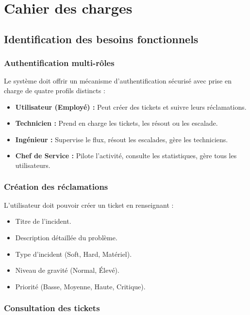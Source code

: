 \documentclass[12pt,a4paper,oneside]{report}
\begin{document}
\section{Cahier des charges}

\subsection{Identification des besoins fonctionnels}

\subsubsection{Authentification multi-rôles}

Le système doit offrir un mécanisme d'authentification sécurisé avec prise en charge de quatre profils distincts :
\begin{itemize}
    \item \textbf{Utilisateur (Employé) :} Peut créer des tickets et suivre leurs réclamations.
    \item \textbf{Technicien :} Prend en charge les tickets, les résout ou les escalade.
    \item \textbf{Ingénieur :} Supervise le flux, résout les escalades, gère les techniciens.
    \item \textbf{Chef de Service :} Pilote l'activité, consulte les statistiques, gère tous les utilisateurs.
\end{itemize}

\subsubsection{Création des réclamations}

L'utilisateur doit pouvoir créer un ticket en renseignant :
\begin{itemize}
    \item Titre de l'incident.
    \item Description détaillée du problème.
    \item Type d'incident (Soft, Hard, Matériel).
    \item Niveau de gravité (Normal, Élevé).
    \item Priorité (Basse, Moyenne, Haute, Critique).
\end{itemize}

\subsubsection{Consultation des tickets}
\end{document}
